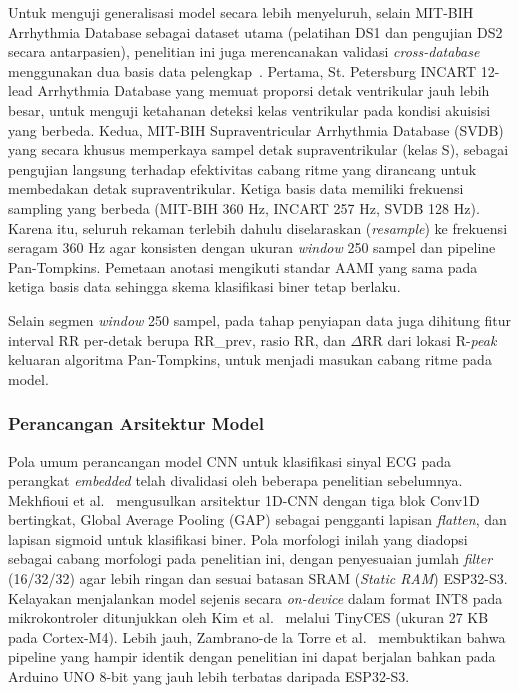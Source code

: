 Untuk menguji generalisasi model secara lebih menyeluruh, selain MIT-BIH Arrhythmia
Database sebagai dataset utama (pelatihan DS1 dan pengujian DS2 secara antarpasien),
penelitian ini juga merencanakan validasi \emph{cross-database}
menggunakan dua basis data pelengkap~\cite{goldberger_2000_physionet}. Pertama, St.
Petersburg INCART 12-lead Arrhythmia Database yang memuat proporsi detak ventrikular
jauh lebih besar, untuk menguji ketahanan deteksi kelas ventrikular pada kondisi
akuisisi yang berbeda. Kedua, MIT-BIH Supraventricular Arrhythmia Database (SVDB) yang
secara khusus memperkaya sampel detak supraventrikular (kelas S), sebagai
pengujian langsung terhadap efektivitas cabang ritme yang dirancang untuk membedakan
detak supraventrikular. Ketiga basis data memiliki frekuensi sampling yang berbeda
(MIT-BIH 360 Hz, INCART 257 Hz, SVDB 128 Hz). Karena itu, seluruh rekaman terlebih dahulu
diselaraskan (\emph{resample}) ke frekuensi seragam 360 Hz agar konsisten dengan ukuran
\emph{window} 250 sampel dan pipeline Pan-Tompkins. Pemetaan anotasi mengikuti standar
AAMI yang sama pada ketiga basis data sehingga skema klasifikasi biner tetap berlaku.

Selain segmen \textit{window} 250 sampel, pada tahap penyiapan data juga dihitung fitur interval RR per-detak berupa RR\_prev, rasio RR, dan $\Delta$RR dari lokasi R-\textit{peak} keluaran algoritma Pan-Tompkins, untuk menjadi masukan cabang ritme pada model.

\subsubsection{Perancangan Arsitektur Model}

Pola umum perancangan model CNN untuk klasifikasi sinyal ECG pada perangkat
\textit{embedded} telah divalidasi oleh beberapa penelitian sebelumnya. Mekhfioui et
al.~\cite{mekhfioui_2025} mengusulkan arsitektur 1D-CNN dengan tiga blok Conv1D
bertingkat, Global Average Pooling (GAP) sebagai pengganti lapisan \emph{flatten}, dan
lapisan sigmoid untuk klasifikasi biner. Pola morfologi inilah yang diadopsi sebagai
cabang morfologi pada penelitian ini, dengan penyesuaian jumlah \emph{filter}
(16/32/32) agar lebih ringan dan sesuai batasan SRAM (\textit{Static RAM}) ESP32-S3. Kelayakan menjalankan
model sejenis secara \emph{on-device} dalam format INT8 pada mikrokontroler ditunjukkan
oleh Kim et al.~\cite{kim_2023} melalui TinyCES (ukuran 27 KB pada Cortex-M4).
Lebih jauh, Zambrano-de la Torre et al.~\cite{zambrano_2026} membuktikan bahwa pipeline
yang hampir identik dengan penelitian ini dapat berjalan bahkan pada Arduino UNO 8-bit
yang jauh lebih terbatas daripada ESP32-S3.

